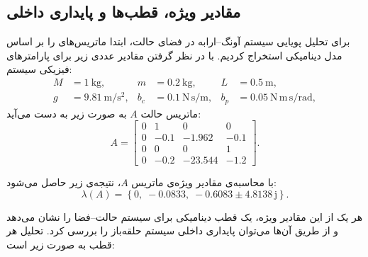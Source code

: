 \documentclass[a4paper,12pt]{article}
\begin{document}
\subsection{مقادیر ویژه، قطب‌ها و پایداری داخلی}

برای تحلیل پویایی سیستم آونگ–ارابه در فضای حالت، ابتدا ماتریس‌های
 را بر اساس مدل دینامیکی استخراج کردیم. با در نظر گرفتن
مقادیر عددی زیر برای پارامترهای فیزیکی سیستم:
\begin{align}
    M   & = 1~\mathrm{kg},             &
    m   & = 0.2~\mathrm{kg},           &
    L   & = 0.5~\mathrm{m},              \\
    g   & = 9.81~\mathrm{m/s^2},       &
    b_c & = 0.1~\mathrm{N\,s/m},       &
    b_p & = 0.05~\mathrm{N\,m\,s/rad},
\end{align}
ماتریس حالت $A$ به صورت زیر به دست می‌آید:
\begin{equation}
    A =
    \begin{bmatrix}
        0 & 1    & 0       & 0    \\
        0 & -0.1 & -1.962  & -0.1 \\
        0 & 0    & 0       & 1    \\
        0 & -0.2 & -23.544 & -1.2
    \end{bmatrix}.
\end{equation}

با محاسبه‌ی مقادیر ویژه‌ی ماتریس $A$، نتیجه‌ی زیر حاصل می‌شود:
\begin{equation}
    \lambda(A) =
    \left\{
    0,\;
    -0.0833,\;
    -0.6083 \pm 4.8138\,\mathrm{j}
    \right\}.
\end{equation}

هر یک از این مقادیر ویژه، یک قطب دینامیکی برای سیستم حالت–فضا را نشان می‌دهد و از طریق آن‌ها می‌توان پایداری داخلی سیستم حلقه‌باز را بررسی کرد. تحلیل هر قطب به صورت زیر است:
\end{document}
